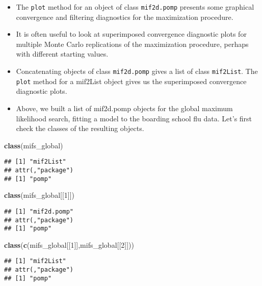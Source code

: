 \documentclass[]{article}
\newenvironment{Shaded}{\begin{snugshade}}{\end{snugshade}}
\newcommand{\KeywordTok}[1]{\textcolor[rgb]{0.13,0.29,0.53}{\textbf{#1}}}
\newcommand{\DecValTok}[1]{\textcolor[rgb]{0.00,0.00,0.81}{#1}}
\newcommand{\NormalTok}[1]{#1}
\begin{document}
\begin{itemize}
\item
  The \texttt{plot} method for an object of class \texttt{mif2d.pomp}
  presents some graphical convergence and filtering diagnostics for the
  maximization procedure.
\item
  It is often useful to look at superimposed convergence diagnostic
  plots for multiple Monte Carlo replications of the maximization
  procedure, perhaps with different starting values.
\item
  Concatenating objects of class \texttt{mif2d.pomp} gives a list of
  class \texttt{mif2List}. The \texttt{plot} method for a mif2List
  object gives us the superimposed convergence diagnostic plots.
\item
  Above, we built a list of mif2d.pomp objects for the global maximum
  likelihood search, fitting a model to the boarding school flu data.
  Let's first check the classes of the resulting objects.
\end{itemize}

\begin{Shaded}
\begin{Highlighting}[]
\KeywordTok{class}\NormalTok{(mifs_global)}
\end{Highlighting}
\end{Shaded}

\begin{verbatim}
## [1] "mif2List"
## attr(,"package")
## [1] "pomp"
\end{verbatim}

\begin{Shaded}
\begin{Highlighting}[]
\KeywordTok{class}\NormalTok{(mifs_global[[}\DecValTok{1}\NormalTok{]])}
\end{Highlighting}
\end{Shaded}

\begin{verbatim}
## [1] "mif2d.pomp"
## attr(,"package")
## [1] "pomp"
\end{verbatim}

\begin{Shaded}
\begin{Highlighting}[]
\KeywordTok{class}\NormalTok{(}\KeywordTok{c}\NormalTok{(mifs_global[[}\DecValTok{1}\NormalTok{]],mifs_global[[}\DecValTok{2}\NormalTok{]]))}
\end{Highlighting}
\end{Shaded}

\begin{verbatim}
## [1] "mif2List"
## attr(,"package")
## [1] "pomp"
\end{verbatim}
\end{document}

